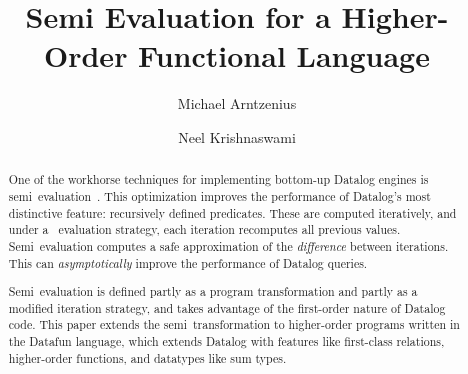 \documentclass[acmsmall]{acmart}\settopmatter{}
\begin{document}
\title{Semi\naive{} Evaluation for a Higher-Order Functional Language}


\author{Michael Arntzenius}

\author{Neel Krishnaswami}


\begin{abstract}
One of the workhorse techniques for implementing bottom-up Datalog engines is
semi\naive\ evaluation~\cite{seminaive}. This optimization improves the
performance of Datalog's most distinctive feature: recursively defined
predicates. These are computed iteratively, and under a \naive\ evaluation
strategy, each iteration recomputes all previous values. Semi\naive\ evaluation
computes a safe approximation of the \emph{difference} between iterations. This
can \emph{asymptotically} improve the performance of Datalog queries.

Semi\naive\ evaluation is defined partly as a program transformation and partly
as a modified iteration strategy, and takes advantage of the first-order nature
of Datalog code.
%
This paper extends the semi\naive\ transformation to higher-order programs
written in the Datafun language, which extends Datalog with features like
first-class relations, higher-order functions, and datatypes like sum types.
\end{abstract}
\end{document}
